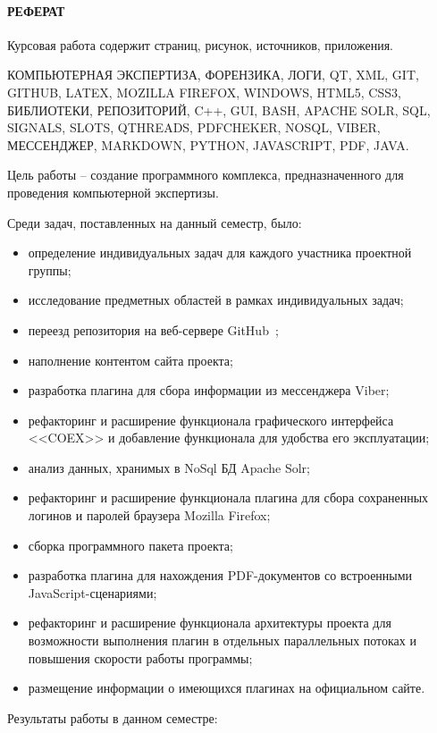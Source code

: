 \newpage
{}
\paragraph{\hfill РЕФЕРАТ \hfill}
Курсовая работа содержит  страниц,  рисунок,  источников,  приложения.

КОМПЬЮТЕРНАЯ ЭКСПЕРТИЗА, ФОРЕНЗИКА, ЛОГИ, QT, XML, GIT, GITHUB, LATEX, MOZILLA FIREFOX, WINDOWS, HTML5, CSS3, БИБЛИОТЕКИ, РЕПОЗИТОРИЙ, C++, GUI, BASH, APACHE SOLR, SQL, SIGNALS, SLOTS, QTHREADS, PDFCHEKER, NOSQL, VIBER, МЕССЕНДЖЕР, MARKDOWN, PYTHON, JAVASCRIPT, PDF, JAVA. 

Цель работы -- создание программного комплекса, предназначенного для проведения компьютерной экспертизы.

Среди задач, поставленных на данный семестр, было: 
\begin{itemize}
  \item определение индивидуальных задач для каждого участника проектной группы;
  \item исследование предметных областей в рамках индивидуальных задач; 
  \item переезд репозитория на веб-сервере GitHub~\cite{github};
  \item наполнение контентом сайта проекта;
  \item разработка плагина для сбора информации из мессенджера Viber;
  \item рефакторинг и расширение функционала графического интерфейса <<COEX>> и добавление функционала для удобства его эксплуатации;
  \item анализ данных, хранимых в NoSql БД Apache Solr;
  \item рефакторинг и расширение функционала плагина для сбора сохраненных логинов и паролей браузера Mozilla Firefox;
  \item сборка программного пакета проекта;  
  \item разработка плагина для нахождения PDF-документов со встроенными JavaScript-сценариями;
  \item рефакторинг и расширение функционала архитектуры проекта для возможности выполнения плагин в отдельных параллельных потоках и повышения скорости работы программы;
  \item размещение информации о имеющихся плагинах на официальном сайте.
\end{itemize}

Результаты работы в данном семестре:

